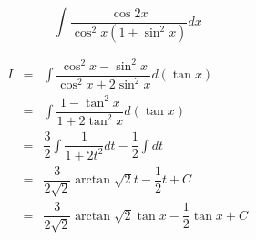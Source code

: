 \begin{example}[][Exam: 28.4.16]
	$$\int\dfrac{\cos 2x}{\cos^{2} x(1+\sin^{2} x)}dx$$
\end{example}
\begin{solution}
	\begin{eqnarray*}
		I & = & \int\dfrac{\cos^{2} x-\sin^{2} x}{\cos^{2} x+2\sin^{2} x}d(\tan x)\\
		  & = & \int\dfrac{1-\tan^{2}x}{1+2\tan^{2} x}d(\tan x)\\
		  & = & \dfrac{3}{2}\int \dfrac{1}{1+2t^{2}}dt - \dfrac{1}{2}\int dt\\
		  & = & \dfrac{3}{2\sqrt{2}}\arctan \sqrt{2}t - \dfrac{1}{2}t + C\\
		  & = & \dfrac{3}{2\sqrt{2}}\arctan \sqrt{2}\tan x - \dfrac{1}{2}\tan x + C
	\end{eqnarray*}
\end{solution}

